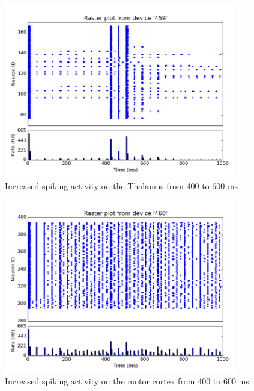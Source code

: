 \documentclass[procedia]{easychair}
\begin{document}
\begin{figure}
\centering
  \centering
  \includegraphics[width=0.9\textwidth]{spikes_thalamus}
  \caption{Increased spiking activity on the Thalamus from 400 to 600 ms}
\label{fig:thalamus_activity}
\end{figure}

\begin{figure}
  \centering
  \includegraphics[width=0.9\textwidth]{spikes_motorcortex}
  \caption{Increased spiking activity on the motor cortex from 400 to 600 ms}
\label{fig:cortex_activity}
\end{figure}
\end{document}
